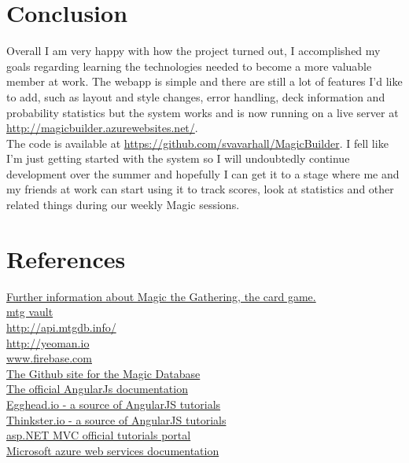 \documentclass[paper=a4, fontsize=11pt]{scrartcl} %
\numberwithin{equation}{section} %
\numberwithin{figure}{section} %
\numberwithin{table}{section} %
\begin{document}
\clearpage

\section{Conclusion}
Overall I am very happy with how the project turned out, I accomplished my goals regarding learning the technologies needed to become a more valuable member at work.
The webapp is simple and there are still a lot of features I’d like to add, such as layout and style changes, error handling, deck information and probability statistics but the system works and is now running on a live server at \href{http://magicbuilder.azurewebsites.net/}{http://magicbuilder.azurewebsites.net/}. 
\\ The code is available at \href{https://github.com/svavarhall/MagicBuilder}{https://github.com/svavarhall/MagicBuilder}. I fell like I'm just getting started with the system so I will undoubtedly continue development over the summer and hopefully I can get it to a stage where me and my friends at work can start using it to track scores, look at statistics and other related things during our weekly Magic sessions. 

\clearpage

\section{References}

\href{http://en.wikipedia.org/wiki/Magic:_The_Gathering}{Further information about Magic the Gathering, the card game.}
\\ \href{http://www.mtgvault.com/}{mtg vault}
\\ \href{http://api.mtgdb.info/}{http://api.mtgdb.info/}
\\ \href{http://yeoman.io}{http://yeoman.io}
\\ \href{http://www.firebase.com}{www.firebase.com}
\\ \href{https://github.com/planeswalkers/CSharpMtgDb.Info}{The Github site for the Magic Database}
\\ \href{https://docs.angularjs.org}{The official AngularJs documentation}
\\ \href{https://egghead.io/}{Egghead.io - a source of AngularJS tutorials}
\\ \href{https://thinkster.io/}{Thinkster.io - a source of AngularJS tutorials}
\\ \href{http://www.asp.net/mvc}{asp.NET MVC official tutorials portal}
\\ \href{https://azure.microsoft.com/en-us/documentation/}{Microsoft azure web services documentation}
\end{document}
